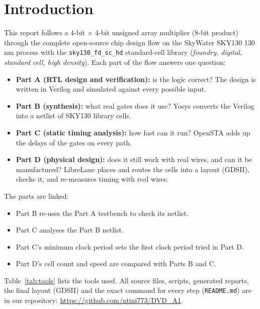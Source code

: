 \documentclass[10pt,a4paper,twocolumn]{article}
\begin{document}
\thispagestyle{fancy}

\section{Introduction}

This report follows a 4-bit $\times$ 4-bit unsigned array multiplier (8-bit product) through the complete open-source chip design flow on the SkyWater SKY130 130\,nm process with the \texttt{sky130\_fd\_sc\_hd} standard-cell library (\emph{foundry, digital, standard cell, high density}). Each part of the flow answers one question:
\begin{itemize}
  \item \textbf{Part A (RTL design and verification):} is the logic correct? The design is written in Verilog and simulated against every possible input.
  \item \textbf{Part B (synthesis):} what real gates does it use? Yosys converts the Verilog into a netlist of SKY130 library cells.
  \item \textbf{Part C (static timing analysis):} how fast can it run? OpenSTA adds up the delays of the gates on every path.
  \item \textbf{Part D (physical design):} does it still work with real wires, and can it be manufactured? LibreLane places and routes the cells into a layout (GDSII), checks it, and re-measures timing with real wires.
\end{itemize}
The parts are linked:
\begin{itemize}
  \item Part B re-uses the Part A testbench to check its netlist.
  \item Part C analyses the Part B netlist.
  \item Part C's minimum clock period sets the first clock period tried in Part D.
  \item Part D's cell count and speed are compared with Parts B and C.
\end{itemize}
Table~\ref{tab:tools} lists the tools used. All source files, scripts, generated reports, the final layout (GDSII) and the exact command for every step (\texttt{README.md}) are in our repository: \url{https://github.com/ntini773/DVD_A1}.
\end{document}
